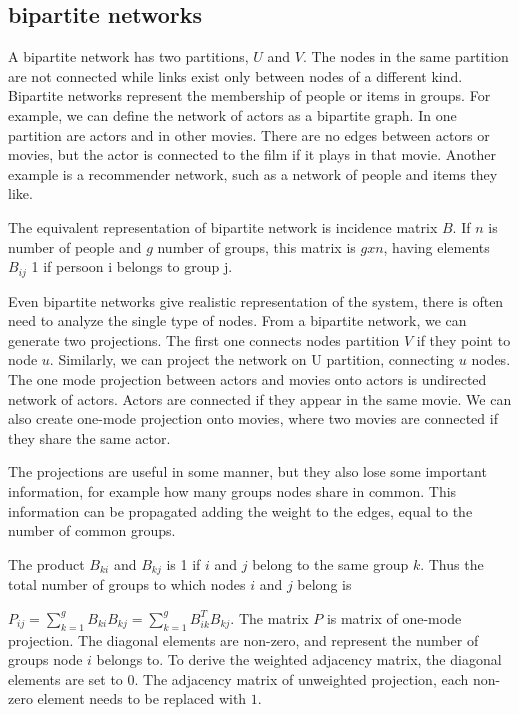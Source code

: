 \subsection{bipartite networks}

A bipartite network has two partitions, $U$ and $V$. The nodes in the same partition are not connected while links exist only between nodes of a different kind. Bipartite networks represent the membership of people or items in groups. For example, we can define the network of actors as a bipartite graph. In one partition are actors and in other movies. There are no edges between actors or movies, but the actor is connected to the film if it plays in that movie. Another example is a recommender network, such as a network of people and items they like. 

The equivalent representation of bipartite network is incidence matrix $B$. If $n$ is number of people and $g$ number of groups, this matrix is $g x n$, having elements $B_{ij}$ 1 if persoon i belongs to group j. 

Even bipartite networks give realistic representation of the system, there is often need to analyze the single type of nodes.  From a bipartite network, we can generate two projections. The first one connects nodes partition $V$ if they point to node $u$. Similarly, we can project the network on U partition, connecting $u$ nodes. The one mode projection between actors and movies onto actors is undirected network of actors. Actors are connected if they appear in the same movie. We can also create one-mode projection onto movies, where two movies are connected if they share the same actor.  

The projections are useful in some manner, but they also lose some important information, for example how many groups nodes share in common. This information can be propagated adding the weight to the edges, equal to the number of common groups.

The product $B_{ki}$ and $B_{kj}$ is 1 if $i$ and $j$ belong to the same group $k$. Thus the total number of groups to which nodes $i$ and $j$ belong is 

$P_{ij} = \sum_{k=1}^g B_{ki}B_{kj} = \sum_{k=1}^g B_{ik}^TB_{kj}$. The matrix $P$ is matrix of one-mode projection. The diagonal elements are non-zero, and represent the number of groups node $i$ belongs to.  To derive the weighted adjacency matrix, the diagonal elements are set to 0. The adjacency matrix of unweighted projection, each non-zero element needs to be replaced with $1$. 

